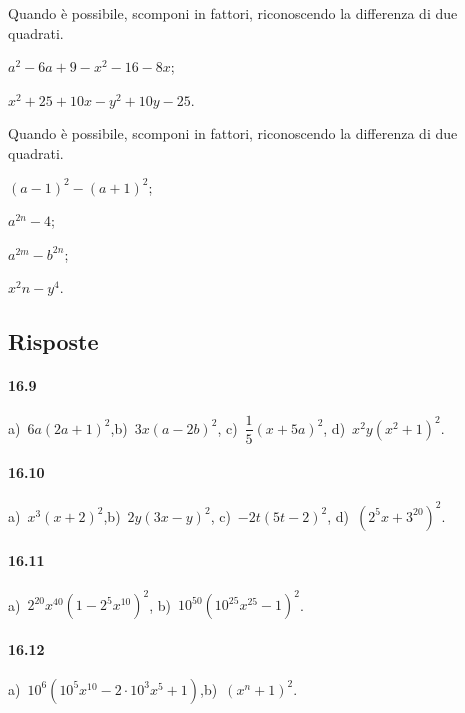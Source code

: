 \begin{multicols}{2}
\begin{esercizio}[\Ast]
\label{ese:16.41}
Quando è possibile, scomponi in fattori, riconoscendo la differenza di due quadrati.
\begin{enumeratea}
 \item $a^{2}-6a+9-x^{2}-16-8x$;
 \item $x^{2}+25+10x-y^{2}+10y-25$.
\end{enumeratea}
\end{esercizio}

\begin{esercizio}
\label{ese:16.42}
Quando è possibile, scomponi in fattori, riconoscendo la differenza di due quadrati.
\begin{enumeratea}
 \item $(a-1)^{2}-(a+1)^{2}$;
 \item $a^{2n}-4$;
 \item $a^{2m}-b^{2n}$;
 \item $x^{2}n-y^{4}$.
\end{enumeratea}
\end{esercizio}
\end{multicols}
\subsection{Risposte}

\paragraph{16.9}
a)~$6a(2a+1)^{2}$,\quad b)~$3x(a-2b)^{2}$, \quad c)~$\dfrac{1}{5}(x+5a)^{2}$, \quad d)~$x^{2}y\left(x^{2}+1\right)^{2}$.

\paragraph{16.10}
a)~$x^{3}(x+2)^{2}$,\quad b)~$2y(3x-y)^{2}$, \quad c)~$-2t(5t-2)^{2}$, \quad d)~$\left(2^{5}x+3^{20}\right)^{2}$.

\paragraph{16.11}
a)~$2^{20} x^{40}\left(1-2^{5}x^{10} \right)^2$, \quad b)~$10^{50}\left(10^{25} x^{25}-1 \right)^2$.

\paragraph{16.12}
a)~$10^{6} \left(10^{5} x^{10}-2 \cdot 10^{3}x^{5}+1\right)$,\quad b)~$\left(x^{n}+1\right)^2$.

